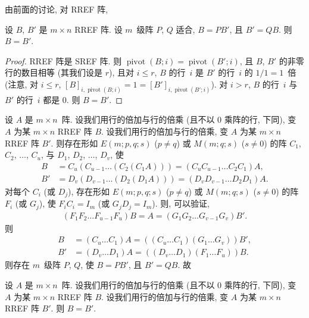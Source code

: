 \documentclass[../libro.tex]{subfiles}
\begin{document}
由前面的讨论, 对 RREF 阵,

\begin{theorem}
    设 \(B\), \(B'\) 是 \(m \times n\) RREF 阵.
    设 \(m\)~级阵 \(P\), \(Q\) 适合,
    \(B = P B'\), 且 \(B' = Q B\).
    则 \(B = B'\).
\end{theorem}

\begin{proof}
    RREF 阵是 SREF 阵.
    则 \(\operatorname{pivot} {(B; i)}
    = \operatorname{pivot} {(B'; i)}\),
    且 \(B\), \(B'\) 的非零行的数目相等
    (其我们设是 \(r\)),
    且对 \(i \leq r\),
    \(B\) 的行~\(i\) 是 \(B'\) 的行~\(i\) 的
    \(1/1 = 1\)~倍
    (注意, 对 \(i \leq r\), \(
            [B]_{i,\operatorname{pivot} {(B; i)}}
            = 1 = [B']_{i,\operatorname{pivot} {(B'; i)}}
    \)).
    对 \(i > r\),
    \(B\) 的行~\(i\) 与 \(B'\) 的行~\(i\) 都是 \(0\).
    则 \(B = B'\).
\end{proof}

设 \(A\) 是 \(m \times n\)~阵.
设我们用行的倍加与行的倍乘
(且不以 \(0\) 乘阵的行, 下同),
变 \(A\) 为某 \(m \times n\) RREF 阵 \(B\).
设我们用行的倍加与行的倍乘,
变 \(A\) 为某 \(m \times n\) RREF 阵 \(B'\).
则存在形如 \(E(m; p, q; s)\) (\(p \neq q\))
或 \(M(m; q; s)\) (\(s \neq 0\)) 的阵
\(C_1\), \(C_2\), \(\dots\), \(C_u\),
与 \(D_1\), \(D_2\), \(\dots\), \(D_v\),
使
\begin{align*}
    B  & = C_u (C_{u-1} \dots (C_2 (C_1 A)))
    = (C_u C_{u-1} \dots C_2 C_1) A,
    \\
    B' & = D_v (D_{v-1} \dots (D_2 (D_1 A)))
    = (D_v D_{v-1} \dots D_2 D_1) A.
\end{align*}
对每个 \(C_i\) (或 \(D_j\)),
存在形如 \(E(m; p, q; s)\) (\(p \neq q\))
或 \(M(m; q; s)\) (\(s \neq 0\)) 的阵
\(F_i\) (或 \(G_j\)),
使 \(F_i C_i = I_m\)
(或 \(G_j D_j = I_m\)).
则, 可以验证,
\begin{align*}
    (F_1 F_2 \dots F_{u-1} F_u) B
    = A
    = (G_1 G_2 \dots G_{v-1} G_v) B'.
\end{align*}
则
\begin{align*}
    B  & = (C_u \dots C_1) A
    = ((C_u \dots C_1) (G_1 \dots G_v)) B',
    \\
    B' & = (D_v \dots D_1) A
    = ((D_v \dots D_1) (F_1 \dots F_u)) B.
\end{align*}
则存在 \(m\)~级阵 \(P\), \(Q\),
使 \(B = P B'\), 且 \(B' = Q B\).
故

\begin{theorem}
    设 \(A\) 是 \(m \times n\)~阵.
    设我们用行的倍加与行的倍乘
    (且不以 \(0\) 乘阵的行, 下同),
    变 \(A\) 为某 \(m \times n\) RREF 阵 \(B\).
    设我们用行的倍加与行的倍乘,
    变 \(A\) 为某 \(m \times n\) RREF 阵 \(B'\).
    则 \(B = B'\).
\end{theorem}
\end{document}
